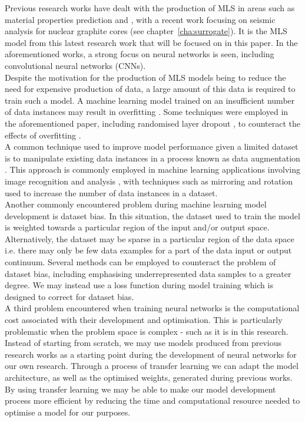 \noindent
Previous research works have dealt with the production of MLS in areas such as material properties prediction \cite{nyshadham2019machine} and \cite{asteris2021predicting}, with a recent work focusing on seismic analysis for nuclear graphite cores (see chapter~\ref{cha:surrogate}). It is the MLS model from this latest research work that will be focused on in this paper. In the aforementioned works, a strong focus on neural networks \cite{gurney1997introduction} is seen, including convolutional neural networks (CNNs).
\\

\noindent
Despite the motivation for the production of MLS models being to reduce the need for expensive production of data, a large amount of this data is required to train such a model. A machine learning model trained on an insufficient number of data instances may result in overfitting \cite{hawkins2004problem}. Some techniques were employed in the aforementioned paper, including randomised layer dropout \cite{srivastava2014dropout}, to counteract the effects of overfitting . 
\\

\noindent
A common technique used to improve model performance given a limited dataset is to manipulate existing data instances in a process known as data augmentation \cite{perez2017effectiveness}. This approach is commonly employed in machine learning applications involving image recognition and analysis \cite{hansen2015tiny}, with techniques such as mirroring and rotation used to increase the number of data instances in a dataset.
\\

\noindent
Another commonly encountered problem during machine learning model development is dataset bias. In this situation, the dataset used to train the model is weighted towards a particular region of the input and/or output space. Alternatively, the dataset may be sparse in a particular region of the data space i.e. there may only be few data examples for a part of the data input or output continuum. Several methods can be employed to counteract the problem of dataset bias, including emphasising underrepresented data samples to a greater degree. We may instead use a loss function during model training which is designed to correct for dataset bias. 
\\

\noindent
A third problem encountered when training neural networks is the computational cost associated with their development and optimisation. This is particularly problematic when the problem space is complex - such as it is in this research. Instead of starting from scratch, we may use models produced from previous research works as a starting point during the development of neural networks for our own research. Through a process of transfer learning \cite{torrey2010transfer} we can adapt the model architecture, as well as the optimised weights, generated during previous works. By using transfer learning we may be able to make our model development process more efficient by reducing the time and computational resource needed to optimise a model for our purposes. 
\\

